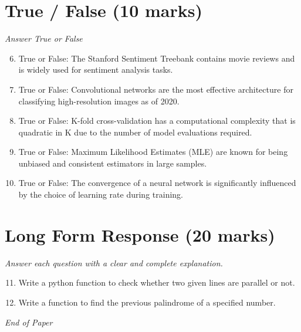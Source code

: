 \documentclass[12pt]{article}
\begin{document}
\section*{True / False (10 marks)}
\textit{Answer True or False}
\begin{enumerate}[label=\arabic*.]
\setcounter{enumi}{5}
\item True or False: The Stanford Sentiment Treebank contains movie reviews and is widely used for sentiment analysis tasks.
\item True or False: Convolutional networks are the most effective architecture for classifying high-resolution images as of 2020.
\item True or False: K-fold cross-validation has a computational complexity that is quadratic in K due to the number of model evaluations required.
\item True or False: Maximum Likelihood Estimates (MLE) are known for being unbiased and consistent estimators in large samples.
\item True or False: The convergence of a neural network is significantly influenced by the choice of learning rate during training.
\end{enumerate}

\section*{Long Form Response (20 marks)}
\textit{Answer each question with a clear and complete explanation.}
\begin{enumerate}[label=\arabic*.]
\setcounter{enumi}{10}
\item Write a python function to check whether two given lines are parallel or not.
\item Write a function to find the previous palindrome of a specified number.
\end{enumerate}

\vfill
\noindent\textit{End of Paper}
\end{document}
